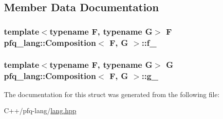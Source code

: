 \subsection{Member Data Documentation}
\hypertarget{structpfq__lang_1_1Composition_ac2acb2594f7648731422581b9f2f63b0}{
\subsubsection[{f\+\_\+}]{\setlength{\rightskip}{0pt plus 5cm}template$<$typename F, typename G$>$ F {\bf pfq\+\_\+lang\+::\+Composition}$<$ F, G $>$\+::f\+\_\+}}\label{structpfq__lang_1_1Composition_ac2acb2594f7648731422581b9f2f63b0}
\hypertarget{structpfq__lang_1_1Composition_a257ccfaae7168eb34420f23c685f3d41}{
\subsubsection[{g\+\_\+}]{\setlength{\rightskip}{0pt plus 5cm}template$<$typename F, typename G$>$ G {\bf pfq\+\_\+lang\+::\+Composition}$<$ F, G $>$\+::g\+\_\+}}\label{structpfq__lang_1_1Composition_a257ccfaae7168eb34420f23c685f3d41}


The documentation for this struct was generated from the following file\+:\begin{DoxyCompactItemize}
\item 
C++/pfq-\/lang/\hyperlink{lang_8hpp}{lang.\+hpp}\end{DoxyCompactItemize}
